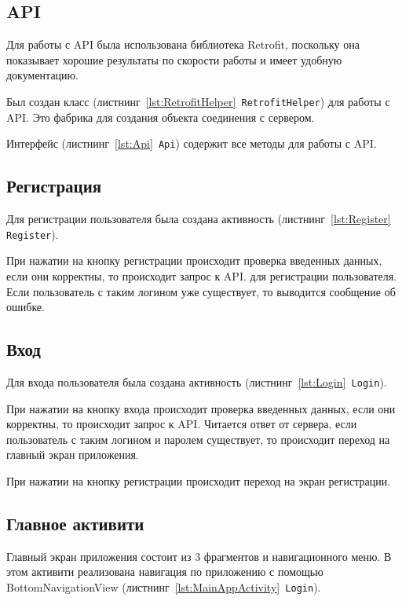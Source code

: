 
\clearpage

\subsection{API}

Для работы с API была использована библиотека Retrofit, поскольку она показывает хорошие результаты по скорости работы
и имеет удобную документацию.

Был создан класс (листнинг~\ref{lst:RetrofitHelper}{\texttt{ RetrofitHelper}}) для работы с API. Это фабрика для создания объекта соединения с сервером.

Интерфейс (листнинг~\ref{lst:Api}{\texttt{ Api}})  содержит все методы для работы с API.


\subsection{Регистрация}

Для регистрации пользователя была создана активность (листнинг~\ref{lst:Register}\texttt{ Register}).

При нажатии на кнопку регистрации происходит проверка введенных данных, если они корректны, то происходит запрос к API.
для регистрации пользователя.
Если пользователь с таким логином уже существует, то выводится сообщение об ошибке.

\subsection{Вход}

Для входа пользователя была создана активность (листнинг~\ref{lst:Login}\texttt{ Login}).

При нажатии на кнопку входа происходит проверка введенных данных, если они корректны, то происходит запрос к API.
Читается ответ от сервера, если пользователь с таким логином и паролем существует, то происходит переход на главный
экран приложения.

При нажатии на кнопку регистрации происходит переход на экран регистрации.

\subsection{Главное активити}

Главный экран приложения состоит из 3 фрагментов и навигационного меню.
В этом активити реализована навигация по приложению с помощью BottomNavigationView (листнинг~\ref{lst:MainAppActivity}\texttt{ Login}).

